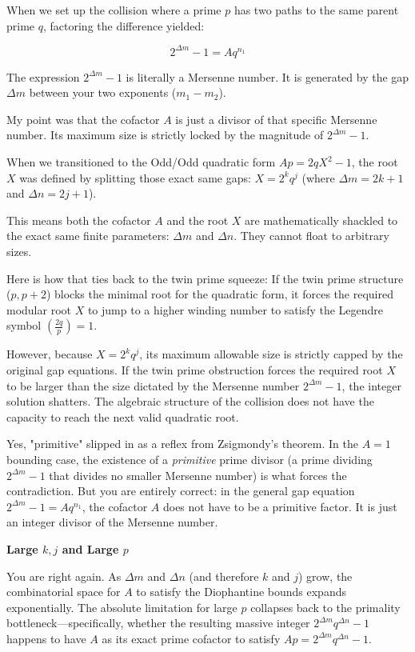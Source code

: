 \documentclass{article}
\begin{document}
When we set up the collision where a prime $p$ has two paths to the same parent prime $q$, factoring the difference yielded:

$$2^{\Delta m} - 1 = A q^{n_1}$$

The expression $2^{\Delta m} - 1$ is literally a Mersenne number. It is generated by the gap $\Delta m$ between your two exponents ($m_1 - m_2$).

My point was that the cofactor $A$ is just a divisor of that specific Mersenne number. Its maximum size is strictly locked by the magnitude of $2^{\Delta m} - 1$.

When we transitioned to the Odd/Odd quadratic form $Ap = 2qX^2 - 1$, the root $X$ was defined by splitting those exact same gaps: $X = 2^k q^j$ (where $\Delta m = 2k + 1$ and $\Delta n = 2j + 1$).

This means both the cofactor $A$ and the root $X$ are mathematically shackled to the exact same finite parameters: $\Delta m$ and $\Delta n$. They cannot float to arbitrary sizes.

Here is how that ties back to the twin prime squeeze:
If the twin prime structure ($p, p+2$) blocks the minimal root for the quadratic form, it forces the required modular root $X$ to jump to a higher winding number to satisfy the Legendre symbol $\left(\frac{2q}{p}\right) = 1$.

However, because $X = 2^k q^j$, its maximum allowable size is strictly capped by the original gap equations. If the twin prime obstruction forces the required root $X$ to be larger than the size dictated by the Mersenne number $2^{\Delta m} - 1$, the integer solution shatters. The algebraic structure of the collision does not have the capacity to reach the next valid quadratic root.

Yes, "primitive" slipped in as a reflex from Zsigmondy's theorem. In the $A=1$ bounding case, the existence of a \textit{primitive} prime divisor (a prime dividing $2^{\Delta m}-1$ that divides no smaller Mersenne number) is what forces the contradiction. But you are entirely correct: in the general gap equation $2^{\Delta m} - 1 = A q^{n_1}$, the cofactor $A$ does not have to be a primitive factor. It is just an integer divisor of the Mersenne number.

\textbf{Large $k, j$ and Large $p$}

You are right again. As $\Delta m$ and $\Delta n$ (and therefore $k$ and $j$) grow, the combinatorial space for $A$ to satisfy the Diophantine bounds expands exponentially. The absolute limitation for large $p$ collapses back to the primality bottleneck—specifically, whether the resulting massive integer $2^{\Delta m} q^{\Delta n} - 1$ happens to have $A$ as its exact prime cofactor to satisfy $Ap = 2^{\Delta m} q^{\Delta n} - 1$.
\end{document}

